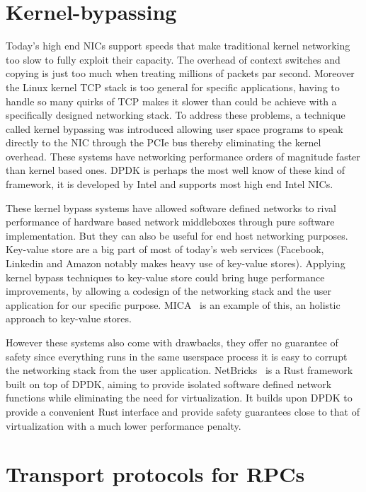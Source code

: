 \section{Kernel-bypassing}

Today's high end NICs support speeds that make traditional kernel
networking too slow to fully exploit their capacity. The overhead of
context switches and copying is just too much when treating millions
of packets par second. Moreover the Linux kernel TCP stack is too
general for specific applications, having to handle so many quirks of
TCP makes it slower than could be achieve with a specifically designed
networking stack. To address these problems, a technique called kernel
bypassing was introduced allowing user space programs to speak
directly to the NIC through the PCIe bus thereby eliminating the
kernel overhead. These systems have networking performance orders of
magnitude faster than kernel based ones. DPDK is perhaps the most well
know of these kind of framework, it is developed by Intel and supports
most high end Intel NICs.

These kernel bypass systems have allowed software defined networks to
rival performance of hardware based network middleboxes through pure
software implementation. But they can also be useful for end host
networking purposes. Key-value store are a big part of most of today's
web services (Facebook, Linkedin and Amazon notably makes heavy use of
key-value stores). Applying kernel bypass techniques to key-value
store could bring huge performance improvements, by allowing a
codesign of the networking stack and the user application for our
specific purpose. MICA~\cite{mica} is an example of this, an holistic
approach to key-value stores.

However these systems also come with drawbacks, they offer no
guarantee of safety since everything runs in the same userspace
process it is easy to corrupt the networking stack from the user
application. NetBricks~\cite{netbricks} is a Rust framework built on
top of DPDK, aiming to provide isolated software defined network
functions while eliminating the need for virtualization. It builds
upon DPDK to provide a convenient Rust interface and provide safety
guarantees close to that of virtualization with a much lower
performance penalty.

\section{Transport protocols for RPCs}

